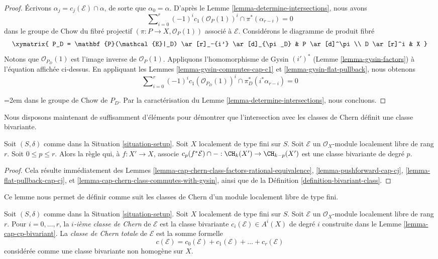 \begin{proof}
Écrivons $\alpha_j = c_j(\mathcal{E}) \cap \alpha$, de sorte que $\alpha_0 = \alpha$.
D'après le Lemme \ref{lemma-determine-intersections}, nous avons
$$
\sum\nolimits_{i = 0}^r
(-1)^i c_1(\mathcal{O}_P(1))^i \cap
\pi^*(\alpha_{r - i}) = 0
$$
dans le groupe de Chow du fibré projectif
$(\pi : P \to X, \mathcal{O}_P(1))$
associé à $\mathcal{E}$. Considérons le diagramme de produit fibré
$$
\xymatrix{
P_D = \mathbf{P}(\mathcal{E}|_D) \ar[r]_-{i'} \ar[d]_{\pi_D} &
P \ar[d]^\pi \\
D \ar[r]^i & X
}
$$
Notons que $\mathcal{O}_{P_D}(1)$ est l'image inverse de $\mathcal{O}_P(1)$.
Appliquons l'homomorphisme de Gysin $(i')^*$ (Lemme \ref{lemma-gysin-factors}) à
l'équation affichée ci-dessus.
En appliquant les Lemmes \ref{lemma-gysin-commutes-cap-c1} et
\ref{lemma-gysin-flat-pullback}, nous obtenons
$$
\sum\nolimits_{i = 0}^r
(-1)^i c_1(\mathcal{O}_{P_D}(1))^i \cap
\pi_D^*(i^*\alpha_{r - i}) = 0
$$
{\emergencystretch=2em dans le groupe de Chow de $P_D$.
Par la caractérisation du Lemme \ref{lemma-determine-intersections},
nous concluons.\par}
\end{proof}

\noindent
Nous disposons maintenant de suffisamment d'éléments pour démontrer que
l'intersection avec les classes de Chern définit une classe bivariante.

\begin{lemma}
\label{lemma-cap-cp-bivariant}
Soit $(S, \delta)$ comme dans la Situation \ref{situation-setup}.
Soit $X$ localement de type fini sur $S$.
Soit $\mathcal{E}$ un $\mathcal{O}_X$-module localement libre
de rang $r$. Soit $0 \leq p \leq r$.
Alors la règle qui, à $f : X' \to X$, associe
$c_p(f^*\mathcal{E}) \cap - : \CH_k(X') \to \CH_{k - p}(X')$
est une classe bivariante de degré $p$.
\end{lemma}

\begin{proof}
Cela résulte immédiatement des Lemmes
\ref{lemma-cap-chern-class-factors-rational-equivalence},
\ref{lemma-pushforward-cap-cj},
\ref{lemma-flat-pullback-cap-cj}, et
\ref{lemma-cap-chern-class-commutes-with-gysin},
ainsi que de la Définition \ref{definition-bivariant-class}.
\end{proof}

\noindent
Ce lemme nous permet de définir comme suit les classes de Chern d'un module
localement libre de type fini.

\begin{definition}
\label{definition-chern-classes-final}
Soit $(S, \delta)$ comme dans la Situation \ref{situation-setup}.
Soit $X$ localement de type fini sur $S$.
Soit $\mathcal{E}$ un $\mathcal{O}_X$-module localement libre
de rang $r$. Pour $i = 0, \ldots, r$, la {\it $i$-ième classe de Chern}
de $\mathcal{E}$ est la classe bivariante
$c_i(\mathcal{E}) \in A^i(X)$ de degré $i$
construite dans le Lemme \ref{lemma-cap-cp-bivariant}. La
{\it classe de Chern totale} de $\mathcal{E}$ est la somme formelle
$$
c(\mathcal{E}) = 
c_0(\mathcal{E}) + c_1(\mathcal{E}) + \ldots + c_r(\mathcal{E})
$$
considérée comme une classe bivariante non homogène sur $X$.
\end{definition}

